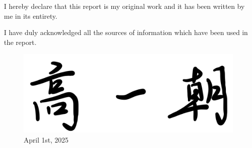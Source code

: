 \documentclass[12pt,twoside,letterpaper]{article}
\begin{document}
\begin{center}
    \begin{minipage}{0.8\textwidth}
        \centering
        \doublespacing
        \justifying
        \large
        \begin{center}
            I hereby declare that this report is my original work and it has been written by me in its entirety. 
            
            I have duly acknowledged all the sources of information which have been used in the report.
        \end{center}
    \end{minipage}
    \vspace{2cm}  

    \begin{figure}[H]
    \centering
    \begin{minipage}{0.6\textwidth}
        \centering
        \includegraphics[width=\linewidth]{figures/Signature.jpeg}
        \vspace{0.5cm}
        \caption*{April 1st, 2025}
        \label{fig:minipage-example}
    \end{minipage}
\end{figure}

    
\end{center}
\newpage


\begin{center}
\tableofcontents
\end{center}
\newpage

\begin{center}
    \listoffigures
\end{center}


\newpage

\end{document}
